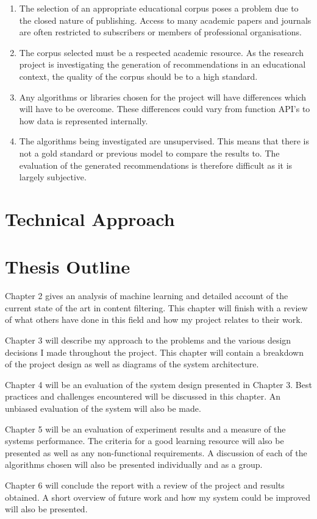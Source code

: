 \begin{enumerate}
    \item The selection of an appropriate educational corpus poses a problem due to the closed nature of publishing.
    Access to many academic papers and journals are often restricted to subscribers or members of professional organisations.

    \item The corpus selected must be a respected academic resource.
    As the research project is investigating the generation of recommendations in an educational context, the quality of the corpus should be to a high standard.

    \item Any algorithms or libraries chosen for the project will have differences which will have to be overcome.
    These differences could vary from function API's to how data is represented internally.

    \item The algorithms being investigated are unsupervised.
    This means that there is not a gold standard or previous model to compare the results to.
    The evaluation of the generated recommendations is therefore difficult as it is largely subjective.
\end{enumerate}

\section{Technical Approach}

\section{Thesis Outline}
Chapter 2 gives an analysis of machine learning and detailed account of the current state of the art in content filtering.
This chapter will finish with a review of what others have done in this field and how my project relates to their work.

Chapter 3 will describe my approach to the problems and the various design decisions I made throughout the project.
This chapter will contain a breakdown of the project design as well as diagrams of the system architecture.

Chapter 4 will be an evaluation of the system design presented in Chapter 3.
Best practices and challenges encountered will be discussed in this chapter.
An unbiased evaluation of the system will also be made.

Chapter 5 will be an evaluation of experiment results and a measure of the systems performance.
The criteria for a good learning resource will also be presented as well as any non-functional requirements.
A discussion of each of the algorithms chosen will also be presented individually and as a group.

Chapter 6 will conclude the report with a review of the project and results obtained.
A short overview of future work and how my system could be improved will also be presented.
